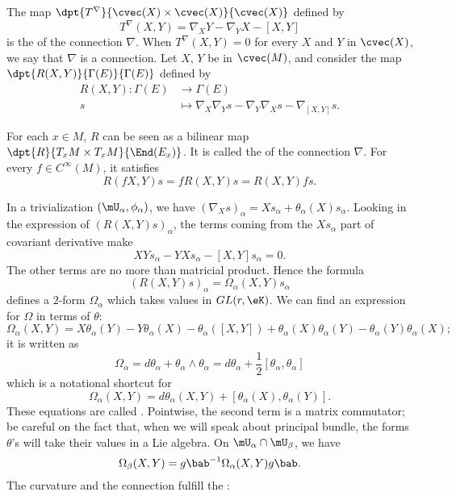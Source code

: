 The map $\dpt{T^{\nabla}}{\cvec(X)\times\cvec(X)}{\cvec(X)}$ defined by
\begin{equation}
	T^{\nabla}(X,Y)=\nabla_XY-\nabla_YX-[X,Y]\label{deftorsion}
\end{equation}
is the  of the connection $\nabla$. When $T^{\nabla}(X,Y)=0$ for every $X$ and $Y$ in $\cvec(X)$, we say that $\nabla$ is a  connection. Let $X$, $Y$ be in $\cvec(M)$, and consider the map $\dpt{R(X,Y)}{\Gamma(E)}{\Gamma(E)}$ defined by
\begin{equation}
	\begin{aligned}
		R(X,Y) \colon \Gamma(E) & \to \Gamma(E)                                                \\
		s                       & \mapsto \nabla_X\nabla_Ys-\nabla_Y\nabla_Xs-\nabla_{[X,Y]}s.
	\end{aligned}
\end{equation}

For each $x\in M$, $R$ can be seen as a bilinear map $\dpt{R}{T_xM\times T_xM}{\End(E_x)}$. It is called the  of the connection $\nabla$. For every $f\in C^{\infty}(M)$, it satisfies
\[
	R(fX,Y)s=fR(X,Y)s=R(X,Y)fs.
\]

In a trivialization $(\mU_{\alpha},\phi_{\alpha})$, we have $(\nabla_Xs)_{\alpha}=Xs_{\alpha}+\theta_{\alpha}(X)s_{\alpha}$. Looking in the expression of $(R(X,Y)s)_{\alpha}$, the terms coming from the $Xs_{\alpha}$ part of covariant derivative make
\[
	XYs_{\alpha}-YXs_{\alpha}-[X,Y]s_{\alpha}=0.
\]
The other terms are no more than matricial product. Hence the formula
\begin{equation}
	(R(X,Y)s)_{\alpha}=\Omega_{\alpha}(X,Y)s_{\alpha}
\end{equation}
defines a $2$-form $\Omega_{\alpha}$ which takes values in $GL(r,\eK)$. We can find an expression for $\Omega$ in terms of $\theta$:
\[
	\Omega_{\alpha}(X,Y)=X\theta_{\alpha}(Y)-Y\theta_{\alpha}(X)-\theta_{\alpha}([X,Y])+\theta_{\alpha}(X)\theta_{\alpha}(Y)-\theta_{\alpha}(Y)\theta_{\alpha}(X);
\]
it is written as
\begin{equation}\label{eq:Omega_ttheta}
	\Omega_{\alpha}=d\theta_{\alpha}+\theta_{\alpha}\wedge\theta_{\alpha}=d\theta_{\alpha}+\frac{1}{2}[\theta_{\alpha},\theta_{\alpha}]
\end{equation}
which is a notational shortcut for
\begin{equation}		\label{EaCurvdVVsq}
	\Omega_{\alpha}(X,Y)=d\theta_{\alpha}(X,Y)+[\theta_{\alpha}(X),\theta_{\alpha}(Y)].
\end{equation}
These equations are called . Pointwise, the second term is a matrix commutator; be careful on the fact that, when we will speak about principal bundle, the forms $\theta$'s will take their values in a Lie algebra. On $\mU_{\alpha}\cap\mU_{\beta}$, we have
\[
	\Omega_{\beta}(X,Y)=g\bab^{-1}\Omega_{\alpha}(X,Y)g\bab.
\]
The curvature and the connection fulfill the :

